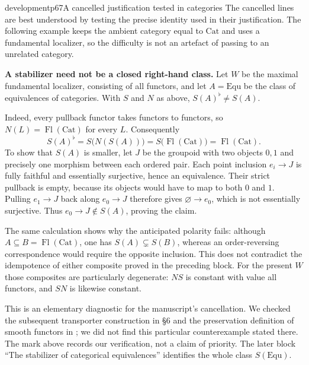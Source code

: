 \begin{dcomment}{development}{p67}{A cancelled justification tested in categories}
The cancelled lines are best understood by testing the precise identity used in their justification. The following example keeps the ambient category equal to $\mathrm{Cat}$ and uses a fundamental localizer, so the difficulty is not an artefact of passing to an unrelated category.

\textbf{A stabilizer need not be a closed right-hand class.}\ours{}
Let $W$ be the maximal fundamental localizer, consisting of all functors, and let $A=\mathrm{Equ}$ be the class of equivalences of categories. With $S$ and $N$ as above, $S(A)^\flat\ne S(A)$.

Indeed, every pullback functor takes functors to functors, so $N(L)=\operatorname{Fl}(\mathrm{Cat})$ for every $L$. Consequently
\[
 S(A)^\flat=S\bigl(N(S(A))\bigr)
 =S\bigl(\operatorname{Fl}(\mathrm{Cat})\bigr)
 =\operatorname{Fl}(\mathrm{Cat}).
\]
To show that $S(A)$ is smaller, let $J$ be the groupoid with two objects $0,1$ and precisely one morphism between each ordered pair. Each point inclusion $e_i\to J$ is fully faithful and essentially surjective, hence an equivalence. Their strict pullback is empty, because its objects would have to map to both $0$ and $1$. Pulling $e_1\to J$ back along $e_0\to J$ therefore gives $\varnothing\to e_0$, which is not essentially surjective. Thus $e_0\to J\notin S(A)$, proving the claim.

The same calculation shows why the anticipated polarity fails: although $A\subseteq B=\operatorname{Fl}(\mathrm{Cat})$, one has $S(A)\subsetneq S(B)$, whereas an order-reversing correspondence would require the opposite inclusion. This does not contradict the idempotence of either composite proved in the preceding block. For the present $W$ those composites are particularly degenerate: $NS$ is constant with value all functors, and $SN$ is likewise constant.

This is an elementary diagnostic for the manuscript's cancellation. We checked the subsequent transporter construction in \S6 and the preservation definition of smooth functors in \citet[Definition 4.6]{Maltsiniotis2005Asphericite}; we did not find this particular counterexample stated there. The mark above records our verification, not a claim of priority. The later block ``The stabilizer of categorical equivalences'' identifies the whole class $S(\mathrm{Equ})$.
\end{dcomment}

